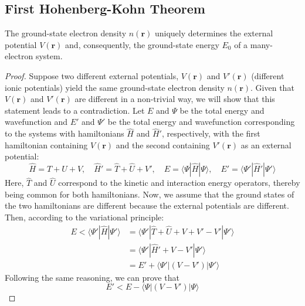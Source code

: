 \subsection{First Hohenberg-Kohn Theorem}

\begin{theorem}
  The ground-state electron density $n(\mathbf{r})$ uniquely determines the external potential $V(\mathbf{r})$ and, consequently, the ground-state energy $E_0$ of a many-electron system.
\end{theorem}
\begin{proof}
  Suppose two different external potentials, $V(\mathbf{r})$ and $V'(\mathbf{r})$ (different ionic potentials) yield the same ground-state electron density $n(\mathbf{r})$. Given that $V(\mathbf{r})$ and $V'(\mathbf{r})$ are different in a non-trivial way, we will show that this statement leads to a contradiction. Let $E$ and $\Psi$ be the total energy and wavefunction and $E'$ and $\Psi'$ be the total energy and wavefunction corresponding to the systems with hamiltonians $\hat{H}$ and $\hat{H}'$, respectively, with the first hamiltonian containing $V(\mathbf{r})$  and the second containing $V'(\mathbf{r})$ as an external potential:
  \begin{equation*}
    \hat{H} = \hat{T} + \hat{U} + V, \quad \hat{H}' = \hat{T} + \hat{U} + V', \quad E = \langle \Psi | \hat{H} | \Psi \rangle, \quad E' = \langle \Psi' | \hat{H}' | \Psi' \rangle 
  \end{equation*}
  Here, $\hat{T}$ and $\hat{U}$ correspond to the kinetic and interaction energy operators, thereby being common for both hamiltonians. Now, we assume that the ground states of the two hamiltonians are different because the external potentials are different. Then, according to the variational principle: 
  \begin{equation}
    \label{eq40}
    \begin{aligned}
      E < \langle \Psi'|\hat{H}|\Psi'\rangle &= \langle \Psi'|\hat{T} + \hat{U} + V + V' - V' |\Psi'\rangle \\
      &= \langle \Psi'|\hat{H}' + V - V' |\Psi'\rangle \\
      &= E' + \langle \Psi'|(V - V')|\Psi'\rangle
    \end{aligned}
  \end{equation}
  Following the same reasoning, we can prove that 
  \begin{equation}
    \label{eq41}
    E' < E - \langle \Psi|(V - V')|\Psi\rangle
  \end{equation}

\end{proof}
